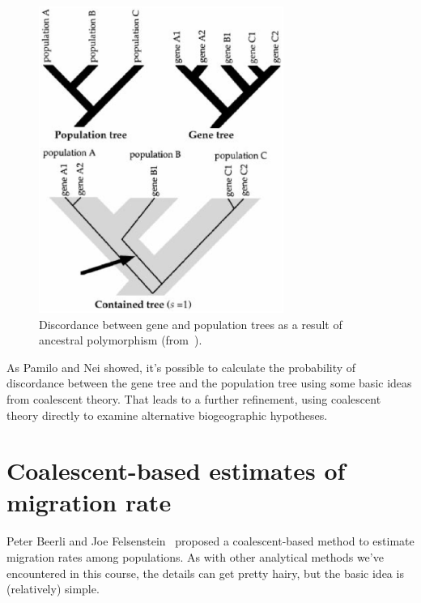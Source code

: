 \begin{figure}
\begin{center}
\includegraphics[height=10cm]{ancestral-polymorphism.eps}
\end{center}
\caption{Discordance between gene and population trees as a result of
  ancestral polymorphism
  (from~\cite{Knowles-2001}).}\label{fig:ancestral-polymorphism} 
\end{figure}

As Pamilo and Nei showed, it's possible to calculate the probability
of discordance between the gene tree and the population tree using
some basic ideas from coalescent theory. That leads to a further
refinement, using coalescent theory directly to examine alternative
biogeographic hypotheses.

\section*{Coalescent-based estimates of migration rate}

Peter Beerli and Joe
Felsenstein~\cite{Beerli-Felsenstein-1999,Beerli-Felsenstein-2001}
proposed a coalescent-based method to estimate migration rates among
populations. As with other analytical methods we've encountered in
this course, the details can get pretty hairy, but the basic idea is
(relatively) simple.

